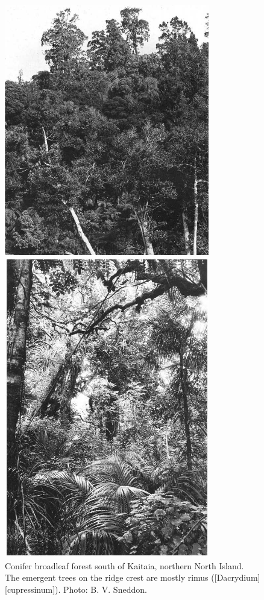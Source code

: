 \begin{figure}[htb]
	\centering
	\begin{minipage}[t]{0.534\textwidth}
		\centering
		\includegraphics[width=0.8\textwidth]{graphics/figure7conifer.jpg}
    	\caption[Conifer broadleaf forest south of Kaitaia]{Conifer broadleaf forest south of Kaitaia, northern North Island.
        The emergent trees on the ridge crest are mostly rimus ([Dacrydium][cupressinum]).
    	Photo: B. V. Sneddon.}%
    	\label{fig:7conifer}
	\end{minipage}\hfill%
	\begin{minipage}[t]{0.446\textwidth}
    	\centering
    	\includegraphics[width=0.8\textwidth]{graphics/figure8conifer.jpg}

\end{minipage}
\end{figure}
